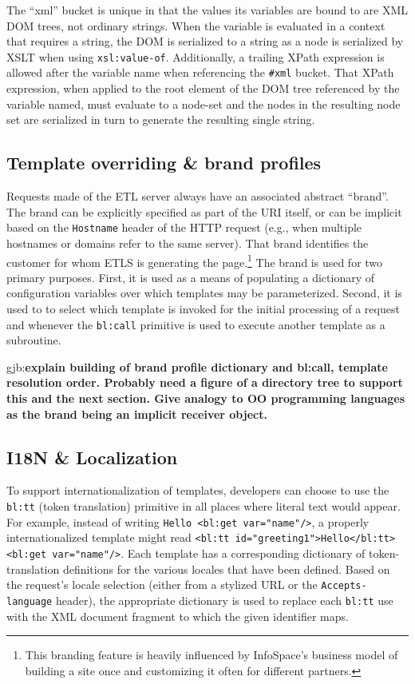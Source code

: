 \documentclass{www2003-submission}
\newcommand{\smtexttt}[1]{{\small\texttt{#1}}}
\newcommand{\gjb}[1]{{\sc gjb:}\textbf{#1}}
\begin{document}
The ``xml'' bucket is unique in that the values its variables are bound
to are XML DOM trees, not ordinary strings.  When the variable is
evaluated in a context that requires a string, the DOM is serialized to
a string as a node is serialized by XSLT when using
\smtexttt{xsl:value-of}.  Additionally, a trailing XPath expression is
allowed after the variable name when referencing the \smtexttt{\#xml}
bucket.  That XPath expression, when applied to the root element of the
DOM tree referenced by the variable named, must evaluate to a node-set
and the nodes in the resulting node set are serialized in turn to
generate the resulting single string.


\subsection{Template overriding \& brand profiles}
\label{ssec-template-dispatch}

Requests made of the ETL server always have an associated abstract
``brand''.  The brand can be explicitly specified as part of the URI
itself, or can be implicit based on the \smtexttt{Hostname} header of
the HTTP request (e.g., when multiple hostnames or domains refer to
the same server).  That brand identifies the customer for whom ETLS is
generating the page.\footnote{This branding feature is heavily
influenced by InfoSpace's business model of building a site once and
customizing it often for different partners.}  The brand is used for
two primary purposes.  First, it is used as a means of populating a
dictionary of configuration variables over which templates may be
parameterized.  Second, it is used to to select which template is
invoked for the initial processing of a request and whenever the
\smtexttt{bl:call} primitive is used to execute another template as a
subroutine.

\gjb{explain building of brand profile dictionary and
bl:call, template resolution order.  Probably need a figure of a
directory tree to support this and the next section.  Give analogy to
OO programming languages as the brand being an implicit receiver
object.}

\subsection{I18N \& Localization}
\label{ssec-localization}

To support internationalization of templates, developers can choose to
use the \smtexttt{bl:tt} (token translation) primitive in all places
where literal text would appear.  For example, instead of writing
\smtexttt{Hello <bl:get var="name"/>}, a properly internationalized
template might read \smtexttt{<bl:tt id="greeting1">Hello</bl:tt>
<bl:get var="name"/>}. Each template has a corresponding dictionary of
token-translation definitions for the various locales that have been
defined.  Based on the request's locale selection (either from a
stylized URL or the \smtexttt{Accepts-language} header), the
appropriate dictionary is used to replace each \smtexttt{bl:tt} use
with the XML document fragment to which the given identifier maps.
\end{document}
